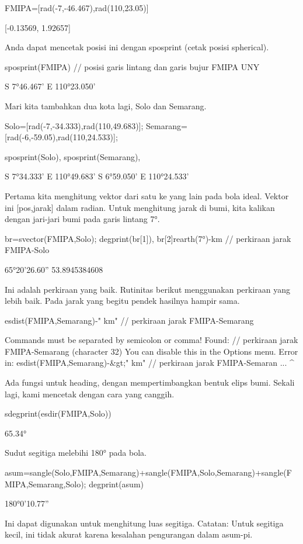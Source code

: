 \documentclass{article}
\begin{document}
\>FMIPA=[rad(-7,-46.467),rad(110,23.05)]


    [-0.13569,  1.92657]

Anda dapat mencetak posisi ini dengan sposprint (cetak posisi
spherical).


\>sposprint(FMIPA) // posisi garis lintang dan garis bujur FMIPA UNY


    S 7°46.467' E 110°23.050'

Mari kita tambahkan dua kota lagi, Solo dan Semarang.


\>Solo=[rad(-7,-34.333),rad(110,49.683)]; Semarang=[rad(-6,-59.05),rad(110,24.533)];

\>sposprint(Solo), sposprint(Semarang),


    S 7°34.333' E 110°49.683'
    S 6°59.050' E 110°24.533'

Pertama kita menghitung vektor dari satu ke yang lain pada bola ideal.
Vektor ini [pos,jarak] dalam radian. Untuk menghitung jarak di bumi,
kita kalikan dengan jari-jari bumi pada garis lintang 7°.


\>br=svector(FMIPA,Solo); degprint(br[1]), br[2]\*rearth(7°)-\>km // perkiraan jarak FMIPA-Solo


    65°20'26.60''
    53.8945384608

Ini adalah perkiraan yang baik. Rutinitas berikut menggunakan
perkiraan yang lebih baik. Pada jarak yang begitu pendek hasilnya
hampir sama.


\>esdist(FMIPA,Semarang)-\>" km" // perkiraan jarak FMIPA-Semarang


    Commands must be separated by semicolon or comma!
    Found:  // perkiraan jarak FMIPA-Semarang (character 32)
    You can disable this in the Options menu.
    Error in:
    esdist(FMIPA,Semarang)-&gt;" km" // perkiraan jarak FMIPA-Semaran ...
                                 ^

Ada fungsi untuk heading, dengan mempertimbangkan bentuk elips bumi.
Sekali lagi, kami mencetak dengan cara yang canggih.


\>sdegprint(esdir(FMIPA,Solo))


         65.34°

Sudut segitiga melebihi 180° pada bola.


\>asum=sangle(Solo,FMIPA,Semarang)+sangle(FMIPA,Solo,Semarang)+sangle(FMIPA,Semarang,Solo); degprint(asum)


    180°0'10.77''

Ini dapat digunakan untuk menghitung luas segitiga. Catatan: Untuk
segitiga kecil, ini tidak akurat karena kesalahan pengurangan dalam
asum-pi.
\end{document}
